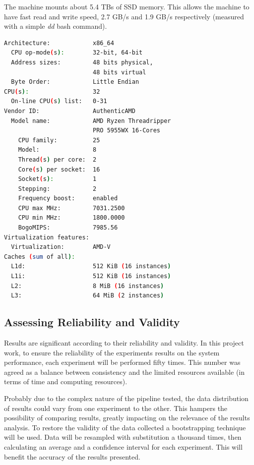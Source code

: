 The machine mounts about 5.4 TBs of \gls{SSD} memory. This allows the machine to have fast read and write speed, 2.7 GB/s and 1.9 GB/s respectively (measured with a simple \textit{dd} bash command).

\begin{lstlisting}[language=bash, caption={Output of a \textit{lscpu} bash command on the test environment.}, label={lst:cpu_snurran}, frame=tb]
Architecture:            x86_64
  CPU op-mode(s):        32-bit, 64-bit
  Address sizes:         48 bits physical, 
                         48 bits virtual
  Byte Order:            Little Endian
CPU(s):                  32
  On-line CPU(s) list:   0-31
Vendor ID:               AuthenticAMD
  Model name:            AMD Ryzen Threadripper 
                         PRO 5955WX 16-Cores
    CPU family:          25
    Model:               8
    Thread(s) per core:  2
    Core(s) per socket:  16
    Socket(s):           1
    Stepping:            2
    Frequency boost:     enabled
    CPU max MHz:         7031.2500
    CPU min MHz:         1800.0000
    BogoMIPS:            7985.56
Virtualization features: 
  Virtualization:        AMD-V
Caches (sum of all):     
  L1d:                   512 KiB (16 instances)
  L1i:                   512 KiB (16 instances)
  L2:                    8 MiB (16 instances)
  L3:                    64 MiB (2 instances)
\end{lstlisting}
\FloatBarrier

\subsection{Assessing Reliability and Validity}

Results are significant according to their reliability and validity. In this project work, to ensure the reliability of the experiments results on the system performance, each experiment will be performed fifty times. This number was agreed as a balance between consistency and the limited resources available (in terms of time and computing resources).

Probably due to the complex nature of the pipeline tested, the data distribution of results could vary from one experiment to the other. This hampers the possibility of comparing results, greatly impacting on the relevance of the results analysis. To restore the validity of the data collected a bootstrapping technique will be used. Data will be resampled with substitution a thousand times, then calculating an average and a confidence interval for each experiment. This will benefit the accuracy of the results presented.